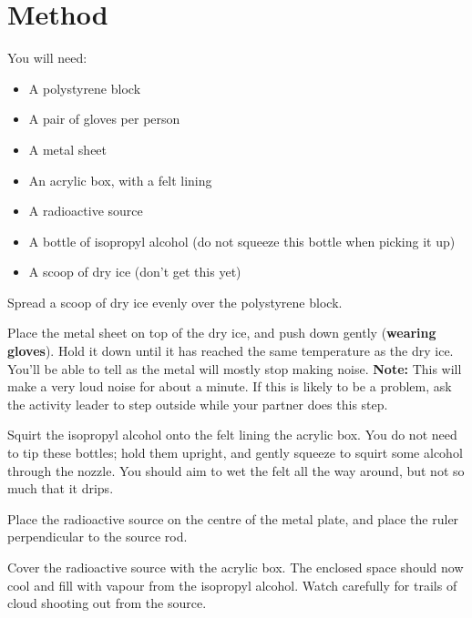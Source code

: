 \documentclass{article}
\begin{document}
\section{Method}

You will need:
\begin{multicols}{2}
\begin{itemize}
    \item A polystyrene block
    \item A pair of gloves per person
    \item A metal sheet
    \item An acrylic box, with a felt lining
    \item A radioactive source
    \item A bottle of isopropyl alcohol (do not squeeze this bottle when picking it up)
    \item A scoop of dry ice (don't get this yet)
\end{itemize}
\end{multicols}


\Step{} Spread a scoop of dry ice evenly over the polystyrene block.


\Step{} Place the metal sheet on top of the dry ice, and push down gently (\textbf{wearing gloves}). Hold it down until it has reached the same temperature as the dry ice. You'll be able to tell as the metal will mostly stop making noise. \textbf{Note:} This will make a very loud noise for about a minute. If this is likely to be a problem, ask the activity leader to step outside while your partner does this step.

\Step{} Squirt the isopropyl alcohol onto the felt lining the acrylic box. You do not need to tip these bottles; hold them upright, and gently squeeze to squirt some alcohol through the nozzle. You should aim to wet the felt all the way around, but not so much that it drips.


\Step{} Place the radioactive source on the centre of the metal plate, and place the ruler perpendicular to the source rod.


\Step{} Cover the radioactive source with the acrylic box. The enclosed space should now cool and fill with vapour from the isopropyl alcohol. Watch carefully for trails of cloud shooting out from the source.
\end{document}
